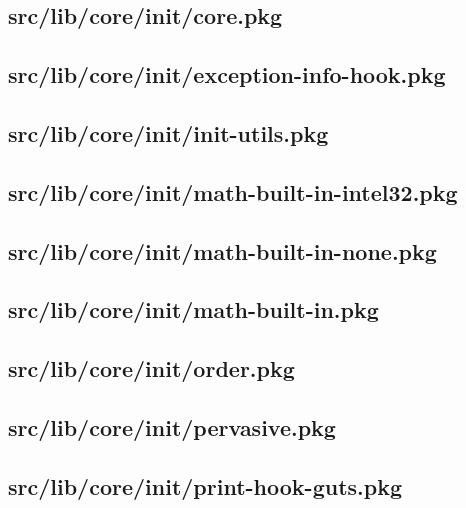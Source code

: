 \subsection{src/lib/core/init/core.pkg}


\subsection{src/lib/core/init/exception-info-hook.pkg}


\subsection{src/lib/core/init/init-utils.pkg}


\subsection{src/lib/core/init/math-built-in-intel32.pkg}


\subsection{src/lib/core/init/math-built-in-none.pkg}


\subsection{src/lib/core/init/math-built-in.pkg}


\subsection{src/lib/core/init/order.pkg}


\subsection{src/lib/core/init/pervasive.pkg}


\subsection{src/lib/core/init/print-hook-guts.pkg}


